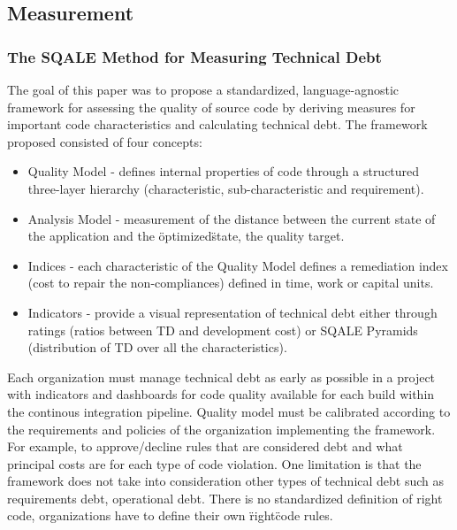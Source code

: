 \documentclass{mprop}
\begin{document}
\subsection{Measurement}

\subsubsection{The SQALE Method for Measuring Technical Debt} \cite{Letouzey2012}
The goal of this paper was to propose a standardized, language-agnostic framework for assessing the quality of source code by deriving measures for important code characteristics and calculating technical debt.
The framework proposed consisted of four concepts:
\begin{itemize}
	\item Quality Model - defines internal properties of code through a structured three-layer hierarchy (characteristic, sub-characteristic and requirement).
	\item Analysis Model - measurement of the distance between the current state of the application and the \"optimized\" state, the quality target.
	\item Indices - each characteristic of the Quality Model defines a remediation index (cost to repair the non-compliances) defined in time, work or capital units.
	\item Indicators - provide a visual representation of technical debt either through ratings (ratios between TD and development cost) or SQALE Pyramids (distribution of TD over all the characteristics).
\end{itemize}

Each organization must manage technical debt as early as possible in a project with indicators and dashboards for code quality available for each build within the continous integration pipeline.
Quality model must be calibrated according to the requirements and policies of the organization implementing the framework. For example, to approve/decline rules that are considered debt and what principal costs are for each type of code violation.
One limitation is that the framework does not take into consideration other types of technical debt such as requirements debt, operational debt.
There is no standardized definition of right code, organizations have to define their own \"right\" code rules.
\end{document}
